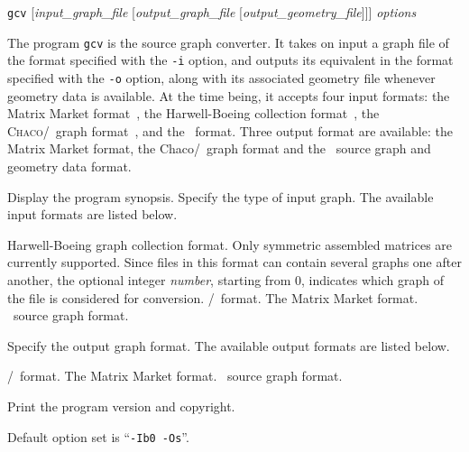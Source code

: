 \begin{itemize}
\progsyn
\texttt{gcv} [{\it input\_graph\_file} [{\it output\_graph\_file} [{\it output\_geometry\_file}]]] {\it options}

\progdes
The program \texttt{gcv} is the source graph converter. It takes on input a graph
file of the format specified with the \texttt{-i} option, and outputs its
equivalent in the format specified with the \texttt{-o} option, along with its
associated geometry file whenever geometry data is available.
At the time being, it accepts four input formats: the Matrix Market
format~\cite{bopore96}, the Harwell-Boeing collection
format~\cite{dugrle92}, the \textsc{Chaco}/\metis\ graph
format~\cite{hele93c}, and the \scotch\ format.  Three output format
are available: the Matrix Market format, the {\sc Chaco}/\metis\ graph
format and the \scotch\ source graph and geometry data format.
\progopt
\begin{itemize}
\iteme[\texttt{-h}]
Display the program synopsis.
Specify the type of input graph.
The available input formats are listed below.
\begin{itemize}
\iteme[{\texttt{b}[{\it number}]}]
Harwell-Boeing graph collection format. Only symmetric assembled matrices
are currently supported.
Since files in this format can contain several graphs one after another,
the optional integer {\it number}, starting
from $0$, indicates which graph of the file is considered for conversion.
/\metis\ format.
\iteme[\texttt{m}]
The Matrix Market format.
\iteme[\texttt{s}]
\scotch\ source graph format.
\end{itemize}
Specify the output graph format. The available output formats are listed below.
\begin{itemize}
/\metis\ format.
\iteme[\texttt{m}]
The Matrix Market format.
\iteme[\texttt{s}]
\scotch\ source graph format.
\end{itemize}
\iteme[\texttt{-V}]
Print the program version and copyright.
\end{itemize}

Default option set is ``\texttt{-Ib0 -Os}''.
\end{itemize}

